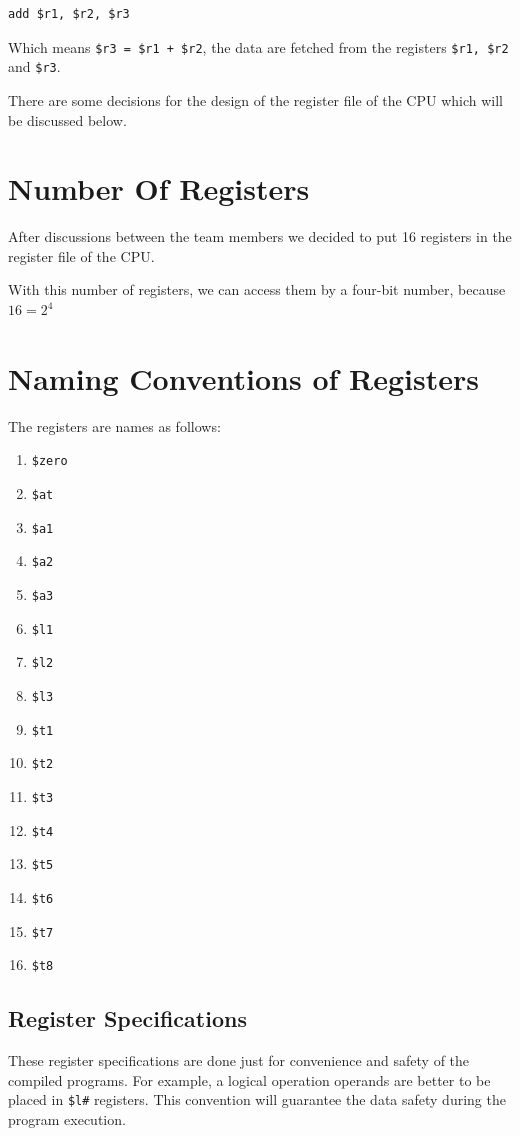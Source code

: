 \documentclass[12pt, dvipsnames, svgnames, x11names, oneside]{book}
\begin{document}
\begin{lstlisting}
add $r1, $r2, $r3
\end{lstlisting}

\noindent Which means \texttt{\$r3 = \$r1 + \$r2}, the data are fetched from the registers \texttt{\$r1, \$r2} and \texttt{\$r3}.

There are some decisions for the design of the register file of the CPU which will be discussed below.

\section{Number Of Registers}\label{sec:num-of-regs}
After discussions between the team members we decided to put 16 registers in the register file of the CPU.

With this number of registers, we can access them by a four-bit number, because $16 = 2^4$

\section{Naming Conventions of Registers}\label{sec:name-of-regs}
The registers are names as follows:
\begin{enumerate}
\item \texttt{\$zero}
\item \texttt{\$at}
\item \texttt{\$a1}
\item \texttt{\$a2}
\item \texttt{\$a3}
\item \texttt{\$l1}
\item \texttt{\$l2}
\item \texttt{\$l3}
\item \texttt{\$t1}
\item \texttt{\$t2}
\item \texttt{\$t3}
\item \texttt{\$t4}
\item \texttt{\$t5}
\item \texttt{\$t6}
\item \texttt{\$t7}
\item \texttt{\$t8}
\end{enumerate}

\subsection{Register Specifications}
These register specifications are done just for convenience and safety of the compiled programs. For example, a logical operation operands are better to be placed in \texttt{\$l\#} registers. This convention will guarantee the data safety during the program execution.
\end{document}
